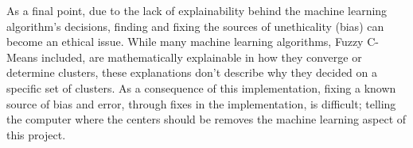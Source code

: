 \documentclass[10pt,twocolumn]{article}
\begin{document}
As a final point, due to the lack of explainability behind the machine learning algorithm’s decisions, finding and fixing the sources of unethicality (bias) can become an ethical issue. While many machine learning algorithms, Fuzzy C-Means included, are mathematically explainable in how they converge or determine clusters, these explanations don’t describe why they decided on a specific set of clusters. As a consequence of this implementation, fixing a known source of bias and error, through fixes in the implementation, is difficult; telling the computer where the centers should be removes the machine learning aspect of this project.




\end{document}
